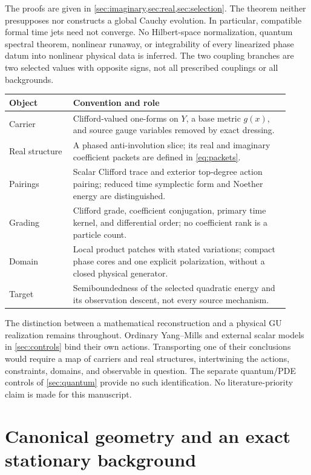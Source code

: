 The proofs are given in \cref{sec:imaginary,sec:real,sec:selection}.
The theorem neither presupposes nor constructs a global Cauchy evolution.
In particular, compatible formal time jets need not converge. No
Hilbert-space normalization, quantum spectral theorem, nonlinear runaway,
or integrability of every linearized phase datum into nonlinear physical
data is inferred. The two coupling branches are two selected values with
opposite signs, not all prescribed couplings or all backgrounds.

\begin{center}\small
\begin{tabular}{p{0.21\linewidth}p{0.71\linewidth}}
\toprule
Object & Convention and role \\
\midrule
Carrier & Clifford-valued one-forms on $Y$, a base metric $g(x)$, and
source gauge variables removed by exact dressing. \\
Real structure & A phased anti-involution slice; its real and imaginary
coefficient packets are defined in \eqref{eq:packets}. \\
Pairings & Scalar Clifford trace and exterior top-degree action pairing;
reduced time symplectic form and Noether energy are distinguished. \\
Grading & Clifford grade, coefficient conjugation, primary time kernel,
and differential order; no coefficient rank is a particle count. \\
Domain & Local product patches with stated variations; compact phase
cores and one explicit polarization, without a closed physical generator. \\
Target & Semiboundedness of the selected quadratic energy and its
observation descent, not every source mechanism. \\
\bottomrule
\end{tabular}
\end{center}

The distinction between a mathematical reconstruction and a physical GU
realization remains throughout. Ordinary Yang--Mills and external scalar
models in \cref{sec:controls} bind their own actions. Transporting one of
their conclusions would require a map of carriers and real structures,
intertwining the actions, constraints, domains, and observable in question.
The separate quantum/PDE controls of \cref{sec:quantum} provide no such
identification. No literature-priority claim is made for this manuscript.

\section{Canonical geometry and an exact stationary background}
\label{sec:background}

